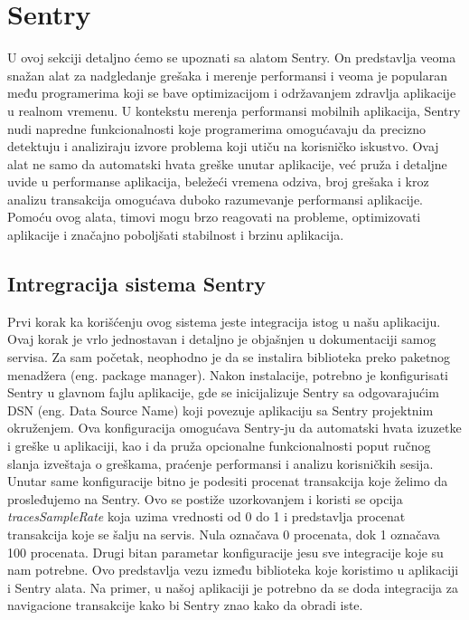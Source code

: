 \documentclass[12pt,oneside]{memoir}
\begin{document}
\section{Sentry}

U ovoj sekciji detaljno ćemo se upoznati sa alatom Sentry. On predstavlja veoma snažan alat za nadgledanje grešaka i merenje performansi i veoma je popularan među programerima koji se bave optimizacijom i održavanjem zdravlja aplikacije u realnom vremenu. U kontekstu merenja performansi mobilnih aplikacija, Sentry nudi napredne funkcionalnosti koje programerima omogućavaju da precizno detektuju i analiziraju izvore problema koji utiču na korisničko iskustvo. Ovaj alat ne samo da automatski hvata greške unutar aplikacije, već pruža i detaljne uvide u performanse aplikacija, beležeći vremena odziva, broj grešaka i kroz analizu transakcija omogućava duboko razumevanje performansi aplikacije. Pomoću ovog alata, timovi mogu brzo reagovati na probleme, optimizovati aplikacije i značajno poboljšati stabilnost i brzinu aplikacija.

\subsection{Intregracija sistema Sentry}

Prvi korak ka korišćenju ovog sistema jeste integracija istog u našu aplikaciju. Ovaj korak je vrlo jednostavan i detaljno je objašnjen u dokumentaciji samog servisa. Za sam početak, neophodno je da se instalira biblioteka preko paketnog menadžera (eng. package manager). Nakon instalacije, potrebno je konfigurisati Sentry u glavnom fajlu aplikacije, gde se inicijalizuje Sentry sa odgovarajućim DSN (eng. Data Source Name) koji povezuje aplikaciju sa Sentry projektnim okruženjem. Ova konfiguracija omogućava Sentry-ju da automatski hvata izuzetke i greške u aplikaciji, kao i da pruža opcionalne funkcionalnosti poput ručnog slanja izveštaja o greškama, praćenje performansi i analizu korisničkih sesija. Unutar same konfiguracije bitno je podesiti procenat transakcija koje želimo da prosleđujemo na Sentry. Ovo se postiže uzorkovanjem i koristi se opcija \textit{tracesSampleRate} koja uzima vrednosti od 0 do 1 i predstavlja procenat transakcija koje se šalju na servis. Nula označava 0 procenata, dok 1 označava 100 procenata. Drugi bitan parametar konfiguracije jesu sve integracije koje su nam potrebne. Ovo predstavlja vezu između biblioteka koje koristimo u aplikaciji i Sentry alata. Na primer, u našoj aplikaciji je potrebno da se doda integracija za navigacione transakcije kako bi Sentry znao kako da obradi iste.
\end{document}
